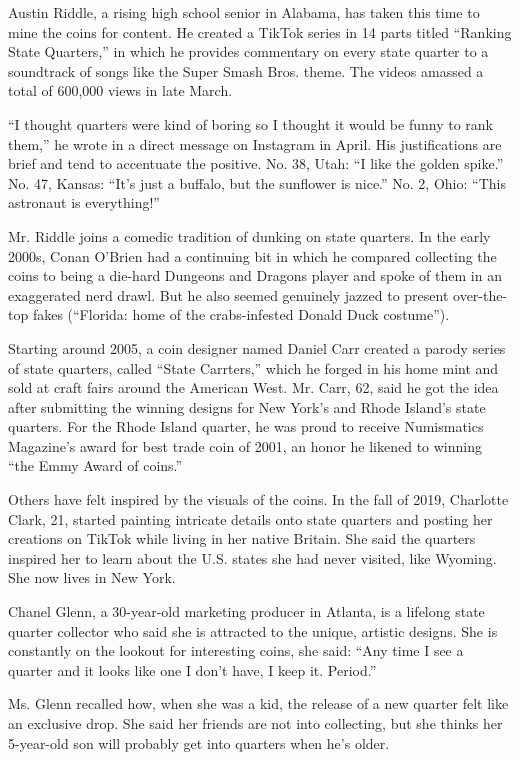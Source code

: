 Austin Riddle, a rising high school senior in Alabama, has taken this
time to mine the coins for content. He created a TikTok series in 14
parts titled ``Ranking State Quarters,'' in which he provides commentary
on every state quarter to a soundtrack of songs like the Super Smash
Bros. theme. The videos amassed a total of 600,000 views in late March.

``I thought quarters were kind of boring so I thought it would be funny
to rank them,'' he wrote in a direct message on Instagram in April. His
justifications are brief and tend to accentuate the positive. No. 38,
Utah: ``I like the golden spike.'' No. 47, Kansas: ``It's just a
buffalo, but the sunflower is nice.'' No. 2, Ohio: ``This astronaut is
everything!''

Mr. Riddle joins a comedic tradition of dunking on state quarters. In
the early 2000s, Conan O'Brien had a continuing bit in which he compared
collecting the coins to being a die-hard Dungeons and Dragons player and
spoke of them in an exaggerated nerd drawl. But he also seemed genuinely
jazzed to present over-the-top fakes (``Florida: home of the
crabs-infested Donald Duck costume'').

Starting around 2005, a coin designer named Daniel Carr created a parody
series of state quarters, called ``State Carrters,'' which he forged in
his home mint and sold at craft fairs around the American West. Mr.
Carr, 62, said he got the idea after submitting the winning designs for
New York's and Rhode Island's state quarters. For the Rhode Island
quarter, he was proud to receive Numismatics Magazine's award for best
trade coin of 2001, an honor he likened to winning ``the Emmy Award of
coins.''

Others have felt inspired by the visuals of the coins. In the fall of
2019, Charlotte Clark, 21, started painting intricate details onto state
quarters and posting her creations on TikTok while living in her native
Britain. She said the quarters inspired her to learn about the U.S.
states she had never visited, like Wyoming. She now lives in New York.

Chanel Glenn, a 30-year-old marketing producer in Atlanta, is a lifelong
state quarter collector who said she is attracted to the unique,
artistic designs. She is constantly on the lookout for interesting
coins, she said: ``Any time I see a quarter and it looks like one I
don't have, I keep it. Period.''

Ms. Glenn recalled how, when she was a kid, the release of a new quarter
felt like an exclusive drop. She said her friends are not into
collecting, but she thinks her 5-year-old son will probably get into
quarters when he's older.

